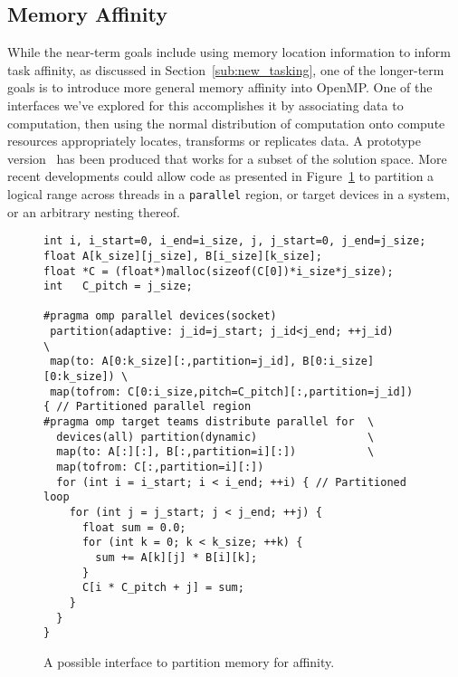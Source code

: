 \subsection{Memory Affinity}
\label{sub:memory_affinity}


While the near-term goals include using memory location information to inform
task affinity, as discussed in Section~\ref{sub:new_tasking}, one of the
longer-term goals is to introduce more general memory affinity into OpenMP.  One
of the interfaces we've explored for this accomplishes it by associating data to
computation, then using the normal distribution of computation onto compute
resources appropriately locates, transforms or replicates data.  A prototype
version~\cite{ctsar-tpds,scogland:7Hpt64iV} has been produced that works for a
subset of the solution space.  More recent developments could allow code as presented
in Figure~\ref{fig:atsar-gemm} to partition a logical range across threads in a
\texttt{parallel} region, or target devices in a system, or an arbitrary nesting
thereof.

\begin{figure}
\begin{verbatim}
int i, i_start=0, i_end=i_size, j, j_start=0, j_end=j_size;
float A[k_size][j_size], B[i_size][k_size];
float *C = (float*)malloc(sizeof(C[0])*i_size*j_size);
int   C_pitch = j_size;

#pragma omp parallel devices(socket)
 partition(adaptive: j_id=j_start; j_id<j_end; ++j_id)         \
 map(to: A[0:k_size][:,partition=j_id], B[0:i_size][0:k_size]) \
 map(tofrom: C[0:i_size,pitch=C_pitch][:,partition=j_id])
{ // Partitioned parallel region
#pragma omp target teams distribute parallel for  \
  devices(all) partition(dynamic)                 \
  map(to: A[:][:], B[:,partition=i][:])           \
  map(tofrom: C[:,partition=i][:])
  for (int i = i_start; i < i_end; ++i) { // Partitioned loop
    for (int j = j_start; j < j_end; ++j) {
      float sum = 0.0;
      for (int k = 0; k < k_size; ++k) {
        sum += A[k][j] * B[i][k];
      }
      C[i * C_pitch + j] = sum;
    }
  }
}
\end{verbatim}
\caption{A possible interface to partition memory for affinity.\label{fig:atsar-gemm}}
\end{figure}

